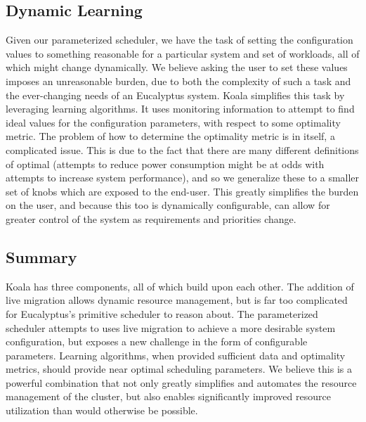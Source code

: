 \subsection{Dynamic Learning}
Given our parameterized scheduler, we have the task of setting the
configuration values to something reasonable for a particular system and set of
workloads, all of which might change dynamically.  We believe asking the user
to set these values imposes an unreasonable burden, due to both the complexity
of such a task and the ever-changing needs of an Eucalyptus system.  Koala
simplifies this task by leveraging learning algorithms.  It uses monitoring
information to attempt to find ideal values for the configuration parameters,
with respect to some optimality metric.  The problem of how to determine the
optimality metric is in itself, a complicated issue.  This is due to the fact
that there are many different definitions of optimal (attempts to reduce power
consumption might be at odds with attempts to increase system performance), and
so we generalize these to a smaller set of knobs which are exposed to the
end-user.  This greatly simplifies the burden on the user, and because this too
is dynamically configurable, can allow for greater control of the system as
requirements and priorities change.

\subsection{Summary}

Koala has three components, all of which build upon each other.  The addition
of live migration allows dynamic resource management, but is far too
complicated for Eucalyptus's primitive scheduler to reason about.  The
parameterized scheduler attempts to uses live migration to achieve a more
desirable system configuration, but exposes a new challenge in the form of
configurable parameters.  Learning algorithms, when provided sufficient data
and optimality metrics, should provide near optimal scheduling parameters.  We
believe this is a powerful combination that not only greatly simplifies and
automates the resource management of the cluster, but also enables
significantly improved resource utilization than would otherwise be possible.
